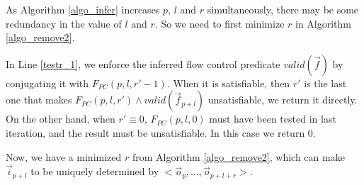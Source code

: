 \documentclass[conference]{IEEEtran}
\begin{document}
As Algorithm \ref{algo_infer} increases $p$, $l$ and $r$ simultaneously,
there may be some redundancy in the value of $l$ and $r$.
So we need to first minimize $r$ in Algorithm \ref{algo_remove2}.


In Line \ref{testr_1},
we enforce the inferred flow control predicate $valid(\vec{f})$ by
conjugating it with $F_{PC}(p,l,r'-1)$.
When it is satisfiable,
then $r'$ is the last one that makes $F_{PC}(p,l,r')\wedge valid(\vec{f}_{p+l})$ unsatisfiable,
we return it directly.
On the other hand,
when $r'\equiv 0$,
$F_{PC}(p,l,0)$ must have been tested in last iteration,
and the result must be unsatisfiable.
In this case we return $0$.

% 
% 

Now, 
we have a minimized $r$ from Algorithm \ref{algo_remove2},
which can make $\vec{i}_{p+l}$ to be uniquely determined by $<\vec{o}_{p},\dots,\vec{o}_{p+l+r}>$.
\end{document}
